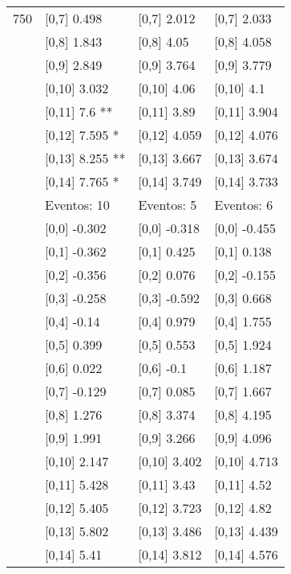 \begin{table}
\begin{tabular}[t]{llll}
750 & {}[0,7] 0.498 & {}[0,7] 2.012 & {}[0,7] 2.033\\
\addlinespace
 & {}[0,8] 1.843 & {}[0,8] 4.05 & {}[0,8] 4.058\\
 & {}[0,9] 2.849 & {}[0,9] 3.764 & {}[0,9] 3.779\\
 & {}[0,10] 3.032 & {}[0,10] 4.06 & {}[0,10] 4.1\\
 & {}[0,11] 7.6 ** & {}[0,11] 3.89 & {}[0,11] 3.904\\
 & {}[0,12] 7.595 * & {}[0,12] 4.059 & {}[0,12] 4.076\\
\addlinespace
 & {}[0,13] 8.255 ** & {}[0,13] 3.667 & {}[0,13] 3.674\\
 & {}[0,14] 7.765 * & {}[0,14] 3.749 & {}[0,14] 3.733\\
 & Eventos:  10 & Eventos:  5 & Eventos:  6\\
 & {}[0,0] -0.302 & {}[0,0] -0.318 & {}[0,0] -0.455\\
 & {}[0,1] -0.362 & {}[0,1] 0.425 & {}[0,1] 0.138\\
\addlinespace
 & {}[0,2] -0.356 & {}[0,2] 0.076 & {}[0,2] -0.155\\
 & {}[0,3] -0.258 & {}[0,3] -0.592 & {}[0,3] 0.668\\
 & {}[0,4] -0.14 & {}[0,4] 0.979 & {}[0,4] 1.755\\
 & {}[0,5] 0.399 & {}[0,5] 0.553 & {}[0,5] 1.924\\
 & {}[0,6] 0.022 & {}[0,6] -0.1 & {}[0,6] 1.187\\
\addlinespace
1000 & {}[0,7] -0.129 & {}[0,7] 0.085 & {}[0,7] 1.667\\
 & {}[0,8] 1.276 & {}[0,8] 3.374 & {}[0,8] 4.195\\
 & {}[0,9] 1.991 & {}[0,9] 3.266 & {}[0,9] 4.096\\
 & {}[0,10] 2.147 & {}[0,10] 3.402 & {}[0,10] 4.713\\
 & {}[0,11] 5.428 & {}[0,11] 3.43 & {}[0,11] 4.52\\
\addlinespace
 & {}[0,12] 5.405 & {}[0,12] 3.723 & {}[0,12] 4.82\\
 & {}[0,13] 5.802 & {}[0,13] 3.486 & {}[0,13] 4.439\\
 & {}[0,14] 5.41 & {}[0,14] 3.812 & {}[0,14] 4.576\\
\bottomrule
\end{tabular}
\end{table}
